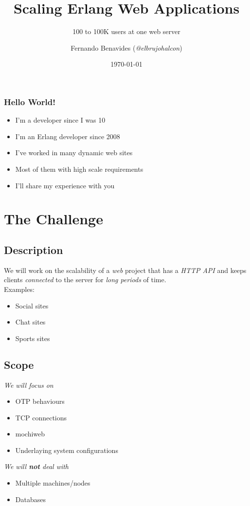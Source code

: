 \documentclass[utf8]{beamer}
\begin{document}
\title{Scaling Erlang Web Applications}
\subtitle{100 to 100K users at one web server}
\author{Fernando Benavides (\textit{@elbrujohalcon})}
\date{\today}

\frame{\titlepage} 

\begin{frame}
	\frametitle{Hello World!}
	\begin{itemize}
		\item<+-> I'm a developer since I was 10
		\item<+-> I'm an Erlang developer since 2008
		\item<+-> I've worked in many dynamic web sites
		\item<+-> Most of them with high scale requirements
		\item<+-> I'll share my experience with you 
	\end{itemize}
\end{frame}


\section{The Challenge}
\subsection{Description}
\begin{frame}
	We will work on the scalability of a \emph{web} project \pause that has a \emph{HTTP API} \pause and keeps clients \emph{connected} to the server \pause for \emph{long periods} of time.\\
\pause Examples:
	\begin{itemize}
		\item Social sites
		\item Chat sites
		\item Sports sites
	\end{itemize}
\end{frame}

\subsection{Scope}
\begin{frame}
	\emph{We will focus on}
	\begin{itemize}
		\item OTP behaviours
		\item TCP connections
		\item mochiweb
		\item Underlaying system configurations
	\end{itemize}
	\pause
	\emph{We will \textbf{not} deal with}
	\begin{itemize}
		\item Multiple machines/nodes
		\item Databases
	\end{itemize}
\end{frame}
\end{document}
